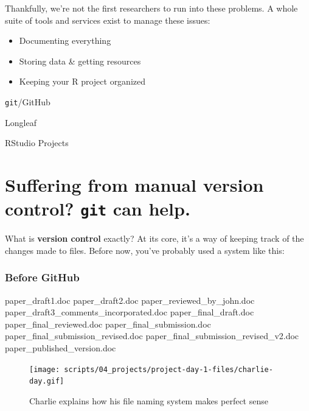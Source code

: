 \documentclass[
  letterpaper,
  DIV=11,
  numbers=noendperiod]{scrreprt}
\newenvironment{Shaded}{\begin{snugshade}}{\end{snugshade}}
\newcommand{\NormalTok}[1]{\textcolor[rgb]{0.00,0.23,0.31}{#1}}
\begin{document}
Thankfully, we're not the first researchers to run into these problems.
A whole suite of tools and services exist to manage these issues:

\begin{itemize}
\item
  Documenting everything
\item
  Storing data \& getting resources
\item
  Keeping your R project organized
\end{itemize}

\texttt{git}/GitHub

Longleaf

RStudio Projects

\hypertarget{suffering-from-manual-version-control-git-can-help.}{%
\section{\texorpdfstring{Suffering from manual version control?
\texttt{git} can
help.}{Suffering from manual version control? git can help.}}\label{suffering-from-manual-version-control-git-can-help.}}

What is \textbf{version control} exactly? At its core, it's a way of
keeping track of the changes made to files. Before now, you've probably
used a system like this:

\hypertarget{before-github}{%
\subsubsection{Before GitHub}\label{before-github}}

\begin{Shaded}
\begin{Highlighting}[]
\NormalTok{paper\_draft1.doc}
\NormalTok{paper\_draft2.doc}
\NormalTok{paper\_reviewed\_by\_john.doc}
\NormalTok{paper\_draft3\_comments\_incorporated.doc}
\NormalTok{paper\_final\_draft.doc}
\NormalTok{paper\_final\_reviewed.doc}
\NormalTok{paper\_final\_submission.doc}
\NormalTok{paper\_final\_submission\_revised.doc}
\NormalTok{paper\_final\_submission\_revised\_v2.doc}
\NormalTok{paper\_published\_version.doc}
\end{Highlighting}
\end{Shaded}

\begin{figure}

{\centering \texttt{[image: scripts/04\_projects/project-day-1-files/charlie-day.gif]}

}

\caption{Charlie explains how his file naming system makes perfect
sense}

\end{figure}
\end{document}
